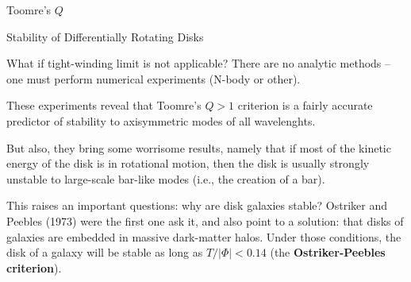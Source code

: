 \documentclass[letterpaper,landscape]{slides}
\begin{document}
\begin{slide}

\begin{center}
{\large \color{red} 
                 Toomre's $Q$ }
\end{center}

\begin{center}
\vskip -0.0in
\end{center}

\vfill
\end{slide}

\begin{slide}

\begin{center}
{\large \color{red} 
                 Stability of Differentially Rotating Disks }
\end{center}

What if tight-winding limit is not applicable? There are no analytic
methods -- one must perform numerical experiments (N-body or
other).

These experiments reveal that Toomre's $Q>1$ criterion is a fairly accurate
predictor of stability to axisymmetric modes of all wavelenghts.

But also, they bring some worrisome results, namely that if most of the
kinetic energy of the disk is in rotational motion, then the disk is
usually strongly unstable to large-scale bar-like modes (i.e., the creation
of a bar).

This raises an important questions: why are disk galaxies stable? Ostriker
and Peebles (1973) were the first one ask it, and also point to a solution:
that disks of galaxies are embedded in massive dark-matter halos. Under those
conditions, the disk of a galaxy will be stable as long as $T/|\Phi| < 0.14$
(the {\bf Ostriker-Peebles criterion}).

\vfill
\end{slide}
\end{document}
